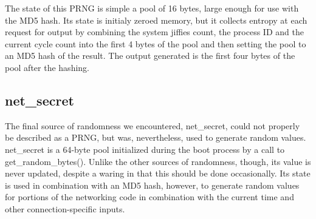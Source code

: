    The state of this PRNG is simple a pool of 16 bytes, large enough for use with the MD5 hash.  Its state is initialy zeroed memory, but it collects entropy at each request for output by combining the system jiffies count, the process ID and the current cycle count into the first 4 bytes of the pool and then setting the pool to an MD5 hash of the result.  The output generated is the first four bytes of the pool after the hashing.

\subsection{net\_secret}
The final source of randomness we encountered, net\_secret, could not properly be described as a PRNG, but was, nevertheless, used to generate random values.  net\_secret is a 64-byte pool initialized during the boot process by a call to get\_random\_bytes().  Unlike the other sources of randomness, though, its value is never updated, despite a waring in \cite{tcp_RFC} that this should be done occasionally.  Its state is used in combination with an MD5 hash, however, to generate random values for portions of the networking code in combination with the current time and other connection-specific inputs.  
